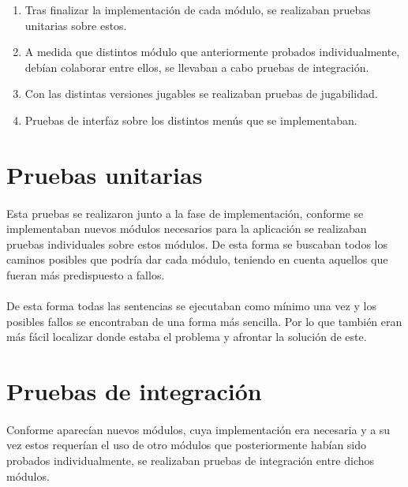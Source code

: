 \begin{enumerate}
    \item Tras finalizar la implementación de cada módulo, se realizaban pruebas unitarias sobre estos.
    \item A medida que distintos módulo que anteriormente probados individualmente, debían colaborar entre ellos, se
    llevaban a cabo pruebas de integración.
    \item Con las distintas versiones jugables se realizaban pruebas de jugabilidad.
    \item Pruebas de interfaz sobre los distintos menús que se implementaban.
\end{enumerate}

\section{Pruebas unitarias}

\paragraph{}
Esta pruebas se realizaron junto a la fase de implementación, conforme se implementaban nuevos módulos necesarios para la aplicación
se realizaban pruebas individuales sobre estos módulos. De esta forma se buscaban todos los caminos posibles que podría dar cada 
módulo, teniendo en cuenta aquellos que fueran más predispuesto a fallos.

\paragraph{}
De esta forma todas las sentencias se ejecutaban como mínimo una vez y los posibles fallos se encontraban de una forma más sencilla.
Por lo que también eran más fácil localizar donde estaba el problema y afrontar la solución de este.

\section{Pruebas de integración}

\paragraph{}
Conforme aparecían nuevos módulos, cuya implementación era necesaria y a su vez estos requerían el uso de otro módulos que 
posteriormente habían sido probados individualmente, se realizaban pruebas de integración entre dichos módulos.

